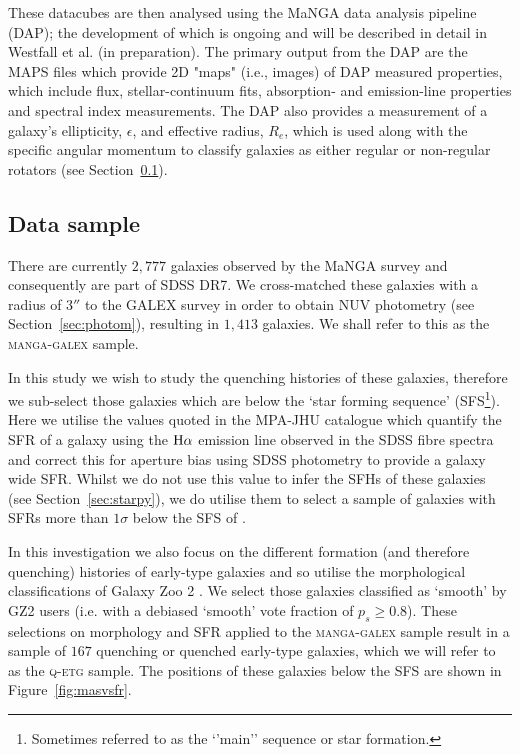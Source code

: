 \documentclass[useAMS,usenatbib]{mn2e}
\begin{document}
These datacubes are then analysed using the MaNGA data analysis pipeline (DAP); the development of which is ongoing and will be described in detail in Westfall et al. (in preparation). The primary output from the DAP are the MAPS files which provide 2D "maps" (i.e., images) of DAP measured properties, which include flux, stellar-continuum fits, absorption- and emission-line properties and spectral index measurements. The DAP also provides a measurement of a galaxy's ellipticity, $\epsilon$, and effective radius, $R_e$, which is used along with the specific angular momentum to classify galaxies as either regular or non-regular rotators (see Section~\ref{sec:mangasample}).

\subsection{Data sample}\label{sec:mangasample}

There are currently $2,777$ galaxies observed by the MaNGA survey and consequently are part of SDSS DR7. We cross-matched these galaxies with a radius of $3''$ to the GALEX survey in order to obtain NUV photometry (see Section~\ref{sec:photom}), resulting in $1,413$ galaxies. We shall refer to this as the \textsc{manga-galex} sample. 

In this study we wish to study the quenching histories of these galaxies, therefore we sub-select those galaxies which are below the `star forming sequence' (SFS\footnote{Sometimes referred to as the `'main'' sequence or star formation.}). Here we utilise the values quoted in the MPA-JHU catalogue \citep{kauffmann03, brinchmann04} which quantify the SFR of a galaxy using the $\rm{H}\alpha$ emission line observed in the SDSS fibre spectra and correct this for aperture bias using SDSS photometry to provide a galaxy wide SFR. Whilst we do not use this value to infer the SFHs of these galaxies (see Section~\ref{sec:starpy}), we do utilise them to select a sample of galaxies with SFRs more than $1\sigma$ below the SFS of \cite{peng10}. 

In this investigation we also focus on the different formation (and therefore quenching) histories of early-type galaxies and so utilise the morphological classifications of Galaxy Zoo 2 \citep[GZ2; ][]{lintott11, GZ2}. We select those galaxies classified as `smooth' by GZ2 users (i.e. with a debiased `smooth' vote fraction of $p_s \geq 0.8$).  These selections on morphology and SFR applied to the \textsc{manga-galex} sample result in a sample of $167$ quenching or quenched early-type galaxies, which we will refer to as the \textsc{q-etg} sample. The positions of these galaxies below the SFS are shown in Figure~\ref{fig:masvsfr}. 
\end{document}
